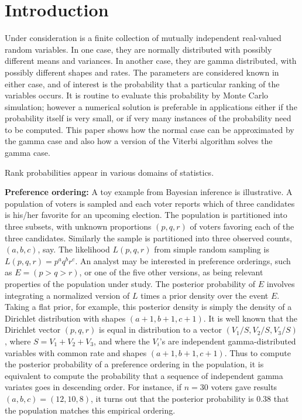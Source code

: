 
\section{Introduction}

Under consideration is a finite collection of mutually independent
real-valued random variables.  In one case, they are normally distributed
with possibly different means and variances.  In another case, they
are gamma distributed, with possibly different shapes and rates.  The parameters are considered known in either case, and of interest is 
the probability that a particular ranking of the variables occurs.  
It is routine to evaluate  this probability by Monte Carlo simulation; however
 a numerical solution is preferable in applications either  if the
probability itself is very small, or if very many instances of the
probability need to be computed.  This paper shows how the normal case
can be approximated by the gamma case and also how a version of the
Viterbi algorithm solves the gamma case.

Rank probabilities appear in various domains of statistics. 

\noindent
{\bf Preference ordering:} 
A toy example from Bayesian inference is illustrative.
A population of voters is sampled and each voter reports which of three 
candidates is his/her favorite for an upcoming election.  The
population is partitioned into three subsets, with unknown proportions 
$(p,q,r)$ of voters favoring each of the three candidates.
Similarly the sample is partitioned into three observed counts, $(a,b,c)$, say.
The likelihood $L(p,q,r)$ from simple random sampling is
$L(p,q,r) = p^a q^b r^c$. An analyst may be interested in preference
orderings, such as $E = ( p > q > r )$, or one of the five other versions,
as being relevant properties of the population under study.  The posterior 
probability of $E$ involves integrating a normalized version
 of  $L$ times a prior density over the event $E$.  Taking a flat prior,
for example, this posterior density is simply the density of
a Dirichlet distribution with shapes $(a+1,b+1,c+1)$.  It is well
known that the Dirichlet vector $(p,q,r)$ is equal in distribution
to a vector $(V_1/S, V_2/S, V_3/S)$, where $S=V_1+V_2+V_3$, and where
the $V_i$'s are independent gamma-distributed variables with common
rate and shapes $(a+1,b+1,c+1)$.  Thus to compute the posterior probability
of a preference ordering in the population, it is equivalent to compute
the probability that a sequence of independent gamma variates goes
in descending order.  For instance, if $n=30$ voters gave results
$(a,b,c)=(12,10,8)$, it turns out that the posterior 
 probability is $0.38$ that the population matches this empirical ordering.

